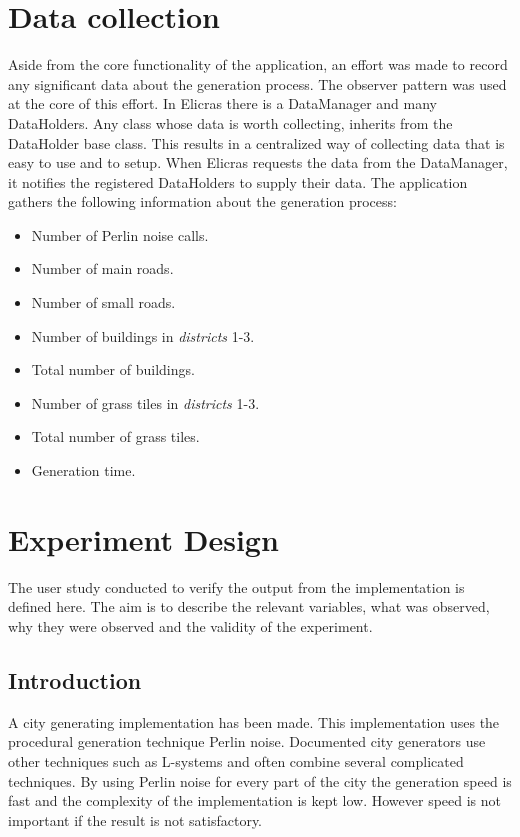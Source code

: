 \section{Data collection}
	Aside from the core functionality of the application, an effort was made to record any significant data about the generation process. The observer pattern was used at the core of this effort. In Elicras there is a DataManager and many DataHolders. Any class whose data is worth collecting, inherits from the DataHolder base class. This results in a centralized way of collecting data that is easy to use and to setup. When Elicras requests the data from the DataManager, it notifies the registered DataHolders to supply their data. The application gathers the following information about the generation process:
	\begin{itemize}
		\item Number of Perlin noise calls.
		\item Number of main roads.
		\item Number of small roads.
		\item Number of buildings in \textit{districts} 1-3.
		\item Total number of buildings.
		\item Number of grass tiles in \textit{districts} 1-3.
		\item Total number of grass tiles.
		\item Generation time.
	\end{itemize}
	
	
\section{Experiment Design}
	The user study conducted to verify the output from the implementation is defined here. The aim is to describe the relevant variables, what was observed, why they were observed and the validity of the experiment.
	\subsection{Introduction}
	A city generating implementation has been made. This implementation uses the procedural generation technique Perlin noise. Documented city generators use other techniques such as L-systems \cite{ProceduralModeling6} and often combine several complicated techniques. By using Perlin noise for every part of the city the generation speed is fast and the complexity of the implementation is kept low. However speed is not important if the result is not satisfactory.
		
